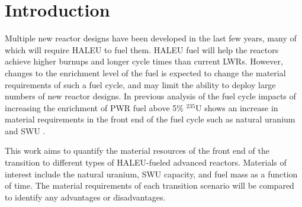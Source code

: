 \section{Introduction}

Multiple new reactor designs have been developed in the last few years, many 
of which will require \gls{HALEU} to fuel them. \gls{HALEU} fuel will help 
the reactors achieve higher burnups and longer cycle times than current 
\glspl{LWR}. However, changes to the enrichment level of the fuel is expected 
to change the material requirements of such a fuel cycle, and may limit the 
ability to deploy large numbers of new reactor designs. In previous analysis 
of the fuel cycle impacts of increasing the enrichment of \gls{PWR} fuel above
5\% $^{235}$U shows an increase in material requirements in the front end of 
the fuel cycle such as natural uranium and \gls{SWU} \cite{burns_reactor_2020}.

This work aims to quantify the material resources of the front end of the 
transition to different types of \gls{HALEU}-fueled advanced reactors. 
Materials of interest include the natural uranium, \gls{SWU} capacity, and 
fuel mass as a function of time. The material requirements of each transition 
scenario will be compared to identify any advantages or disadvantages. 